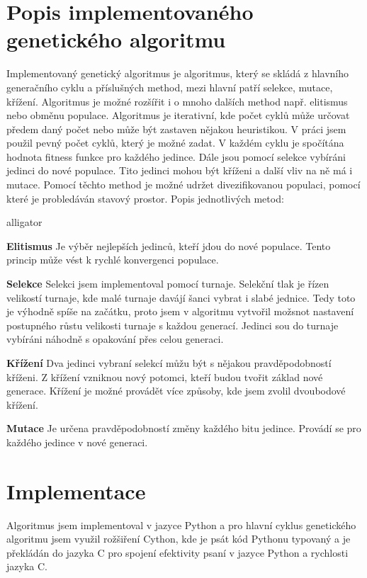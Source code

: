 \documentclass[11pt]{article}
\begin{document}
\section{Popis implementovaného genetického algoritmu}\label{kap:popisALG}
Implementovaný genetický algoritmus je algoritmus, který se skládá z hlavního generačního cyklu a příslušných method, mezi hlavní patří selekce, mutace, křížení. Algoritmus je možné rozšířit i o mnoho dalších method např. elitismus nebo obměnu populace. Algoritmus je iterativní, kde počet cyklů může určovat předem daný počet nebo může být zastaven nějakou heuristikou. V práci jsem použil pevný počet cyklů, který je možné zadat. V každém cyklu je spočítána hodnota fitness funkce pro každého jedince. Dále jsou pomocí selekce vybíráni jedinci do nové populace. Tito jedinci mohou být kříženi a další vliv na ně má i mutace. Pomocí těchto method je možné udržet divezifikovanou populaci, pomocí které je probledáván stavový prostor. Popis jednotlivých metod:
\begin{labeling}{alligator}
\item[\textbf{Elitismus}] Je výběr nejlepších jedinců, kteří jdou do nové populace. Tento princip může vést k rychlé konvergenci populace.
\item[\textbf{Selekce}] Selekci jsem implementoval pomocí turnaje. Selekční tlak je řízen velikostí turnaje, kde malé turnaje davájí šanci vybrat i slabé jednice. Tedy toto je výhodně spíše na začátku, proto jsem v algoritmu vytvořil možsnot nastavení postupného růstu velikosti turnaje s každou generací. Jedinci sou do turnaje vybíráni náhodně s opakování přes celou generaci. 
\item[\textbf{Křížení}] Dva jedinci vybraní selekcí můžu být s nějakou pravděpodobností kříženi. Z křížení vzniknou nový potomci, kteří budou tvořit základ nové generace. Křížení je možné provádět více způsoby, kde jsem zvolil dvoubodové křížení.
\item[\textbf{Mutace}] Je určena pravděpodobností změny každého bitu jedince. Provádí se pro každého jedince v nové generaci.

\end{labeling}
\section{Implementace}\label{kap:implementace}
Algoritmus jsem implementoval v jazyce Python a pro hlavní cyklus genetického algoritmu jsem využil rožšiření Cython, kde je psát kód Pythonu typovaný a je překládán do jazyka C pro spojení efektivity psaní v jazyce Python a rychlosti jazyka C. 
\end{document}
